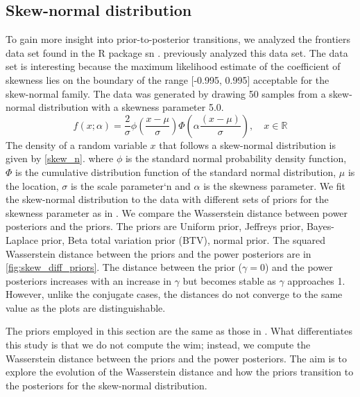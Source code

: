 \documentclass[12pt]{article}
\begin{document}
\subsection{Skew-normal distribution}
To gain more insight into prior-to-posterior transitions, we analyzed the frontiers data set found in the R package sn  \citep{azzalini2023}. \cite{ghaderinezhadWassersteinImpactMeasure2022} previously analyzed this data set. The data set is interesting because the maximum likelihood estimate of the coefficient of skewness lies on the boundary of the range [-0.995, 0.995] acceptable for the skew-normal family. The data was generated by drawing 50 samples from a skew-normal distribution with a skewness parameter 5.0. 
\begin{equation}
    f(x; \alpha) = \frac{2}{\sigma} \phi \left( \frac{x - \mu}{\sigma} \right) \Phi \left( \alpha \frac{(x - \mu)}{\sigma} \right), \quad x \in \mathbb{R}
    \label{skew_n}
\end{equation}
The density of a random variable $x$ that follows a skew-normal distribution \citep{azzaliniClassD1985} is given by \cref{skew_n}.
where $\phi$ is the standard normal probability density function, $\Phi$ is the cumulative distribution function of the standard normal distribution, $\mu$ is the location, $\sigma$ is the scale parameter`n and $\alpha$ is the skewness parameter.
We fit the skew-normal distribution to the data with different sets of priors
for the skewness parameter as in
\cite{ghaderinezhadWassersteinImpactMeasure2022}. We compare the Wasserstein
distance between  power posteriors and the priors. The priors are
Uniform prior, Jeffreys prior, Bayes-Laplace prior,  Beta total variation prior (BTV), normal prior. The squared Wasserstein distance between the priors and the power posteriors
are in \cref{fig:skew_diff_priors}. The distance between
the prior ($\gamma=0$) and the power posteriors increases with an increase in
$\gamma$ but becomes stable as $\gamma$ approaches 1. However, unlike the conjugate cases, the distances do not converge to the same value as the plots are distinguishable.

The priors employed in this section are the same as those in  \citep{ghaderinezhadWassersteinImpactMeasure2022}. What differentiates this study is that we do not compute the \gls{wim}; instead, we compute the Wasserstein distance between the priors and the power posteriors. The aim is to explore the evolution of the Wasserstein distance and how the priors transition to the posteriors for the skew-normal distribution. 
\end{document}
